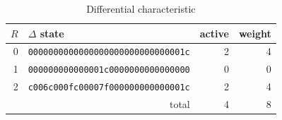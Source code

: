 \begin{table}[t]
\centering
\caption{Differential characteristic}
\begin{tabular}{rlrr}
\toprule
$R$ & $\Delta$ state & active & weight \\
\midrule
0 & \texttt{0000000000000000000000000000001c} & 2 & 4 \\
1 & \texttt{000000000000001c0000000000000000} & 0 & 0 \\
2 & \texttt{c006c000fc00007f000000000000001c} & 2 & 4 \\
\midrule
\multicolumn{2}{r}{total} & 4 & 8 \\
\bottomrule
\end{tabular}
\end{table}